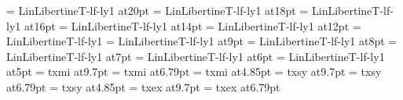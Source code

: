 %
\font\twentyrm=     LinLibertineT-lf-ly1 at20pt
\font\eighteenrm=   LinLibertineT-lf-ly1 at18pt
\font\sixteenrm=    LinLibertineT-lf-ly1 at16pt
\font\fourteenrm=   LinLibertineT-lf-ly1 at14pt
\font\twelverm=     LinLibertineT-lf-ly1 at12pt
\font\tenrm=        LinLibertineT-lf-ly1
\font\ninerm=       LinLibertineT-lf-ly1 at9pt
\font\eightrm=      LinLibertineT-lf-ly1 at8pt
\font\sevenrm=      LinLibertineT-lf-ly1 at7pt
\font\sixrm=        LinLibertineT-lf-ly1 at6pt
\font\fiverm=       LinLibertineT-lf-ly1 at5pt
%
\def\twentyi{\font\fzzozznzzt=txmi at19.4pt \fzzozznzzt}%
\def\eighteeni{\font\fzzozznzzt=txmi at17.46pt \fzzozznzzt}%
\def\sixteeni{\font\fzzozznzzt=txmi at15.52pt \fzzozznzzt}%
\def\fourteeni{\font\fzzozznzzt=txmi at13.58pt \fzzozznzzt}%
\def\twelvei{\font\fzzozznzzt=txmi at11.64pt \fzzozznzzt}%
\font\teni=         txmi at9.7pt%
\def\ninei{\font\fzzozznzzt=txmi at8.73pt \fzzozznzzt}%
\def\eighti{\font\fzzozznzzt=txmi at7.76pt \fzzozznzzt}%
\font\seveni=       txmi at6.79pt
\def\sixi{\font\fzzozznzzt=txmi at5.82pt \fzzozznzzt}%
\font\fivei=        txmi at4.85pt
%
\def\twentysy{\font\fzzozznzzt=txsy at19.4pt \fzzozznzzt}%
\def\eighteensy{\font\fzzozznzzt=txsy at17.46pt \fzzozznzzt}%
\def\sixteensy{\font\fzzozznzzt=txsy at15.52pt \fzzozznzzt}%
\def\fourteensy{\font\fzzozznzzt=txsy at13.58pt \fzzozznzzt}%
\def\twelvesy{\font\fzzozznzzt=txsy at11.64pt \fzzozznzzt}%
\font\tensy=         txsy at9.7pt%
\def\ninesy{\font\fzzozznzzt=txsy at8.73pt \fzzozznzzt}%
\def\eightsy{\font\fzzozznzzt=txsy at7.76pt \fzzozznzzt}%
\font\sevensy=       txsy at6.79pt
\def\sixsy{\font\fzzozznzzt=txsy at5.82pt \fzzozznzzt}%
\font\fivesy=        txsy at4.85pt
%
\def\twentyex{\font\fzzozznzzt=txex at19.4pt \fzzozznzzt}%
\def\eighteenex{\font\fzzozznzzt=txex at17.46pt \fzzozznzzt}%
\def\sixteenex{\font\fzzozznzzt=txex at15.52pt \fzzozznzzt}%
\def\fourteenex{\font\fzzozznzzt=txex at13.58pt \fzzozznzzt}%
\def\twelveex{\font\fzzozznzzt=txex at11.64pt \fzzozznzzt}%
\font\tenex=         txex at9.7pt%
\def\nineex{\font\fzzozznzzt=txex at8.73pt \fzzozznzzt}%
\def\eightex{\font\fzzozznzzt=txex at7.76pt \fzzozznzzt}%
\font\sevenex=       txex at6.79pt
\def\sixex{\font\fzzozznzzt=txex at5.82pt \fzzozznzzt}%

